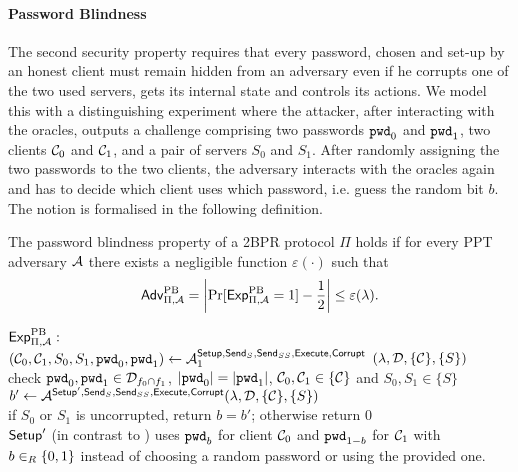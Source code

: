 \paragraph{Password Blindness}
The second security property requires that every password, chosen and set-up by an honest client must remain hidden from an adversary even if he corrupts one of the two used servers, gets its internal state and controls its actions.
We model this with a distinguishing experiment where the attacker, after interacting with the oracles, outputs a challenge comprising two passwords $\mathtt{pwd}_0$ and $\mathtt{pwd}_1$, two clients $\mathcal{C}_0$ and $\mathcal{C}_1$, and a pair of servers $S_0$ and $S_1$.
After randomly assigning the two passwords to the two clients, the adversary interacts with the oracles again and has to decide which client uses which password, i.e. guess the random bit $b$.
The notion is formalised in the following definition.

\begin{definition}\label{def:zk}
The password blindness property of a 2BPR protocol $\Pi$ holds if for every PPT adversary $\mathcal{A}$ there exists a negligible function $\varepsilon(\cdot)$ such that
\[ \mathsf{Adv}_{\Pi, \mathcal{A}}^{\mathrm{PB}}=\left|\Pr[\mathsf{Exp}_{\Pi, \mathcal{A}}^{\mathrm{PB}}=1]-\frac{1}{2}\right|\leq\varepsilon(\lambda). \]

\noindent
$\mathsf{Exp}_{\Pi, \mathcal{A}}^{\mathrm{PB}}:$ \\
\hspace*{2em} $(\mathcal{C}_0, \mathcal{C}_1, S_0,S_1,\mathtt{pwd}_0,\mathtt{pwd}_1)\gets\mathcal{A}_1^{\mathsf{Setup},\mathsf{Send}_S,\mathsf{Send}_{SS}, \mathsf{Execute},\mathsf{Corrupt}}$ $(\lambda,\mathcal{D},\{\mathcal{C}\},\{S\})$ \\
\hspace*{2em} check $\mathtt{pwd}_0,\mathtt{pwd}_1\in\mathcal{D}_{f_0\cap f_1}$, $|\mathtt{pwd}_0|=|\mathtt{pwd}_1|$, $\mathcal{C}_0,\mathcal{C}_1\in\{\mathcal{C}\}$ and $S_0,S_1\in\{S\}$\\
\hspace*{2em} $ b'\gets\mathcal{A}^{\mathsf{Setup}',\mathsf{Send}_S,\mathsf{Send}_{SS}, \mathsf{Execute},\mathsf{Corrupt}}(\lambda,\mathcal{D},\{\mathcal{C}\},\{S\})$\\
\hspace*{2em} if $S_0$ or $S_1$ is uncorrupted, return $b=b'$; otherwise return $0$ \\

\noindent
$\mathsf{Setup}'$ (in contrast to \Setup) uses $\mathtt{pwd}_b$ for client $\mathcal{C}_0$ and $\mathtt{pwd}_{1-b}$ for $\mathcal{C}_1$ with $b\in_R\{0,1\}$ instead of choosing a random password or using the provided one.
\eod
\end{definition}

